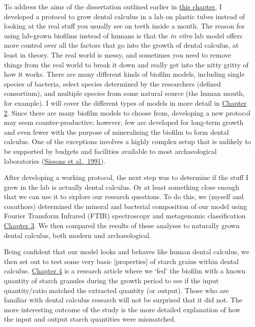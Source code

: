 \documentclass[
  letterpaper,
]{book}
\begin{document}
To address the aims of the dissertation outlined earlier in
\protect\hyperlink{intro-aims}{this chapter}, I developed a protocol to
grow dental calculus in a lab on plastic tubes instead of looking at the
real stuff you usually see on teeth inside a mouth. The reason for using
lab-grown biofilms instead of humans is that the \emph{in vitro} lab
model offers more control over all the factors that go into the growth
of dental calculus, at least in theory. The real world is messy, and
sometimes you need to remove things from the real world to break it down
and really get into the nitty gritty of how it works. There are many
different kinds of biofilm models, including single species of bacteria,
select species determined by the researchers (defined consortium), and
multiple species from some natural source (the human mouth, for
example). I will cover the different types of models in more detail in
\protect\hyperlink{background}{Chapter 2}. Since there are many biofilm
models to choose from, developing a new protocol may seem
counter-productive; however, few are developed for long-term growth and
even fewer with the purpose of mineralising the biofilm to form dental
calculus. One of the exceptions involves a highly complex setup that is
unlikely to be supported by budgets and facilities available to most
archaeological laboratories
(\protect\hyperlink{ref-sissonsMultistationPlaque1991}{Sissons et al.,
1991}).

After developing a working protocol, the next step was to determine if
the stuff I grew in the lab is actually dental calculus. Or at least
something close enough that we can use it to explore our research
questions. To do this, we (myself and coauthors) determined the mineral
and bacterial composition of our model using Fourier Transform Infrared
(FTIR) spectroscopy and metagenomic classification
\protect\hyperlink{byoc-valid}{Chapter 3}. We then compared the results
of these analyses to naturally grown dental calculus, both modern and
archaeological.

Being confident that our model looks and behaves like human dental
calculus, we then set out to test some very basic {[}properties{]} of
starch grains within dental calculus.
\protect\hyperlink{byoc-starch}{Chapter 4} is a research article where
we `fed' the biofilm with a known quantity of starch granules during the
growth period to see if the input quantity/ratio matched the extracted
quantity (or output). Those who are familiar with dental calculus
research will not be surprised that it did not. The more interesting
outcome of the study is the more detailed explanation of how the input
and output starch quantities were mismatched.
\end{document}
